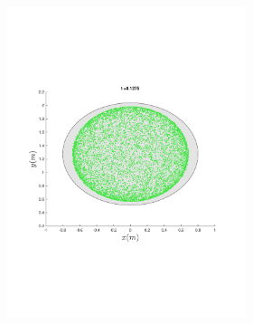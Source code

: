 \begin{figure}
{\begin{subfigure}{0.5\textwidth}
\begin{subfigure}[b]{0.5\textwidth}
        \includegraphics[trim={1cm 7cm 1cm 7cm},
        width=\textwidth]{figures/method/FunnelSimOverlaid18funnel-1}
      \end{subfigure}%
      \begin{subfigure}[b]{0.5\textwidth}

\end{subfigure}
\end{subfigure}}
\end{figure}
